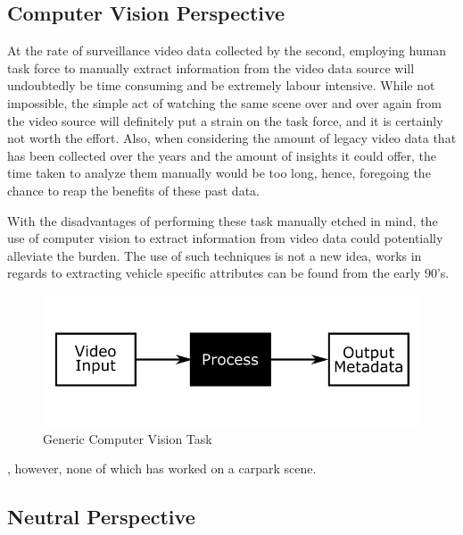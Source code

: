 \subsection{Computer Vision Perspective}

At the rate of surveillance video data collected by the second, employing human task force to manually extract information from the video data source will undoubtedly be time consuming and be extremely labour intensive. 
While not impossible, the simple act of watching the same scene over and over again from the video source will definitely put a strain on the task force, and it is certainly not worth the effort. Also, when considering the amount of legacy video data that has been collected over the years and the amount of insights it could offer, the time taken to analyze them manually would be too long, hence, foregoing the chance to reap the benefits of these past data.
 
With the disadvantages of performing these task manually etched in mind, the use of computer vision to extract information from video data could potentially alleviate the burden. The use of such techniques is not a new idea, works in regards to extracting vehicle specific attributes can be found from the early 90's. 


\begin{figure}[!hbt]\centering
\includegraphics[width=.8\textwidth]{image/general/simpleframe.png}
\caption{Generic Computer Vision Task}
\label{fig:genericCV}
\end{figure}





, however, none of which has worked on a carpark scene.   





\subsection{Neutral Perspective}





